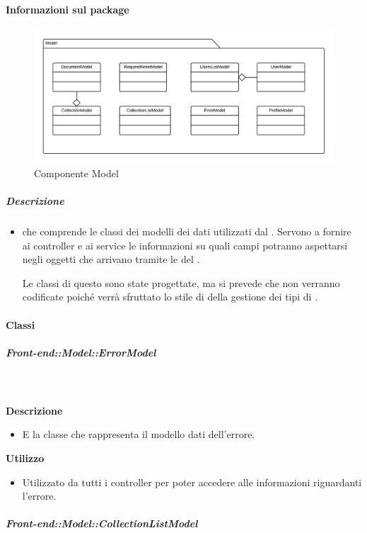   \paragraph{Informazioni sul package}
    \begin{figure}[H] 
      \begin{center} 
        \includegraphics[width=\textwidth]{packages/Front-end::Model.png}  
        \caption{Componente Model}
      \end{center}  
    \end{figure} 
  \subparagraph{Descrizione} 
    \begin{itemize}
    \item[]  che comprende le classi dei modelli dei dati utilizzati dal . Servono a fornire ai controller e ai service le informazioni su quali campi potranno aspettarsi negli oggetti che arrivano tramite le  del .

Le classi di questo  sono state progettate, ma si prevede che non verranno codificate poiché verrà sfruttato lo stile di  della gestione dei tipi di .
    \end{itemize} 
    \paragraph{Classi}
      \subparagraph{Front-end::Model::ErrorModel}
        
        \textbf{\\ \\ Descrizione} 
          \begin{itemize}
            \item[] E la classe che rappresenta il modello dati dell'errore.
          \end{itemize}      
        \textbf{Utilizzo}  
          \begin{itemize}
            \item[] Utilizzato da tutti i controller per poter accedere alle informazioni riguardanti l'errore.
          \end{itemize}
      \subparagraph{Front-end::Model::CollectionListModel}
        
